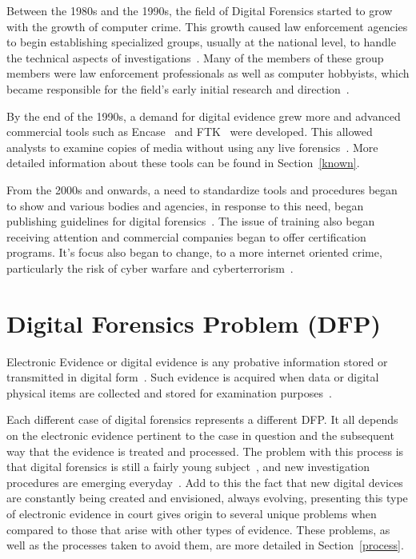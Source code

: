 Between the 1980s and the 1990s, the field of Digital Forensics started to grow with the growth of computer crime. This growth caused law enforcement agencies to begin establishing specialized groups, usually at the national level, to handle the technical aspects of investigations~\cite{mohay2003computer}. Many of the members of these group members were law enforcement professionals as well as computer hobbyists, which became responsible for the field's early initial research and direction~\cite{sommer2004future}.

By the end of the 1990s, a demand for digital evidence grew more and advanced commercial tools such as Encase~\cite{EnCase} and \ac{FTK}~\cite{FTK} were developed. This allowed analysts to examine copies of media without using any live forensics~\cite{casey2014digital}. More detailed information about these tools can be found in Section~\ref{known}.

From the 2000s and onwards, a need to standardize tools and procedures began to show and various bodies and agencies, in response to this need, began publishing guidelines for digital forensics~\cite{casey2014digital}. The issue of training also began receiving attention and commercial companies began to offer certification programs. It's focus also began to change, to a more internet oriented crime, particularly the risk of cyber warfare and cyberterrorism~\cite{sommer2004future}.

\section{Digital Forensics Problem (DFP)}

Electronic Evidence or digital evidence is any probative information stored or transmitted in digital form~\cite{casey2011digital}. Such evidence is acquired when data or digital physical items are collected and stored for examination purposes~\cite{ballou2010electronic}.

Each different case of digital forensics represents a different \ac{DFP}. It all depends on the electronic evidence pertinent to the case in question and the subsequent way that the evidence is treated and processed. The problem with this process is that digital forensics is still a fairly young subject~\cite{reith2002examination}, and new investigation procedures are emerging everyday~\cite{allen2005computer}. Add to this the fact that new digital devices are constantly being created and envisioned, always evolving, presenting this type of electronic evidence in court gives origin to several unique problems when compared to those that arise with other types of evidence. These problems, as well as the processes taken to avoid them, are more detailed in Section~\ref{process}.

